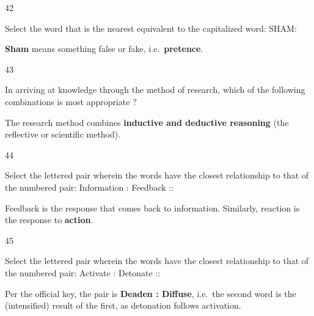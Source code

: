 \begin{question}{42}
{Select the word that is the nearest equivalent to the capitalized word: SHAM:\par}
\begin{explain}
\textbf{Sham} means something false or fake, i.e.\ \textbf{pretence}.
\end{explain}
\end{question}

\begin{question}{43}
{In arriving at knowledge through the method of research, which of the following combinations is most appropriate ?\par}
\begin{explain}
The research method combines \textbf{inductive and deductive reasoning} (the reflective or scientific method).
\end{explain}
\end{question}

\begin{question}{44}
{Select the lettered pair wherein the words have the closest relationship to that of the numbered pair: Information : Feedback ::\par}
\begin{explain}
Feedback is the response that comes back to information. Similarly, reaction is the response to \textbf{action}.
\end{explain}
\end{question}

\begin{question}{45}
{Select the lettered pair wherein the words have the closest relationship to that of the numbered pair: Activate : Detonate ::\par}
\begin{explain}
Per the official key, the pair is \textbf{Deaden : Diffuse}, i.e.\ the second word is the (intensified) result of the first, as detonation follows activation.
\end{explain}
\end{question}


